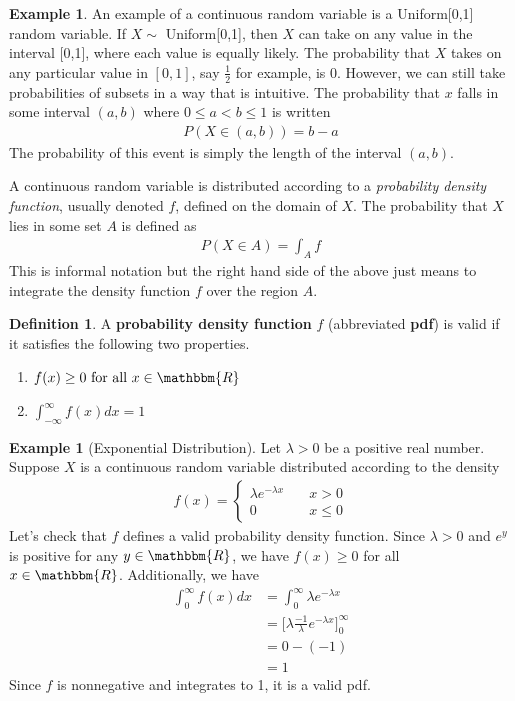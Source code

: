 \documentclass{tufte-book}
\newcommand\real{\mathbbm{R}}
\theoremstyle{definition}
\numberwithin{theorem}{section}
\newtheorem{definition}[theorem]{Definition}
\numberwithin{definition}{section}
\numberwithin{lemma}{section}
\numberwithin{corollary}{section}
\numberwithin{proposition}{section}
\numberwithin{remark}{section}
\numberwithin{claim}{section}
\numberwithin{observation}{section}
\numberwithin{fact}{section}
\numberwithin{assumption}{section}
\newtheorem{example}[theorem]{Example}
\numberwithin{example}{section}
\numberwithin{exercise}{section}
\begin{document}
\begin{example}
An example of a continuous random variable is a Uniform[0,1] random variable. If $X \sim$ Uniform[0,1], then $X$ can take on any value in the interval [0,1], where each value is equally likely. The probability that $X$ takes on any particular value in $[0,1]$, say $\frac{1}{2}$ for example, is 0. However, we can still take probabilities of subsets in a way that is intuitive. The probability that $x$ falls in some interval $(a,b)$ where $0\leq a<b\leq 1$ is written
\begin{align*}
P(X \in (a,b)) = b-a
\end{align*}
The probability of this event is simply the length of the interval $(a,b)$.
\end{example}
A continuous random variable is distributed according to a \textit{probability density function}, usually denoted $f$, defined on the domain of $X$. The probability that $X$ lies in some set $A$ is defined as
\begin{align*}
P(X \in A) = \int_A f
\end{align*}
This is informal notation but the right hand side of the above just means to integrate the density function $f$ over the region $A$. 

\begin{definition}
A \textbf{probability density function} $f$ (abbreviated \textbf{pdf}) is valid if it satisfies the following two properties.
\begin{enumerate}
\item $f(x) \geq 0 \text{ for all } x \in \real$ 
\item $\int_{-\infty}^{\infty} f(x) dx = 1$
\end{enumerate}
\end{definition}

\begin{example}[Exponential Distribution]
Let $\lambda > 0$ be a positive real number. Suppose $X$ is a continuous random variable distributed according to the density
\begin{align*}
f(x) =\begin{cases}
 \lambda e^{-\lambda x} \hspace{1em} &x > 0 \\
 0 &x \leq 0
\end{cases}
\end{align*}
Let's check that $f$ defines a valid probability density function. Since $\lambda > 0$ and $e^{y}$ is positive for any $y \in \real$, we have $f(x) \geq 0$ for all $x \in \real$. Additionally, we have
\begin{align*}
\int_{0}^{\infty} f(x) dx &= \int_{0}^{\infty} \lambda e^{-\lambda x} \\
&= \Big[\lambda \frac{-1}{\lambda}e^{-\lambda x} \Big]^{\infty}_{0} \\
&= 0 -(-1) \\
&= 1
\end{align*}
Since $f$ is nonnegative and integrates to 1, it is a valid pdf.
\end{example}
\end{document}
